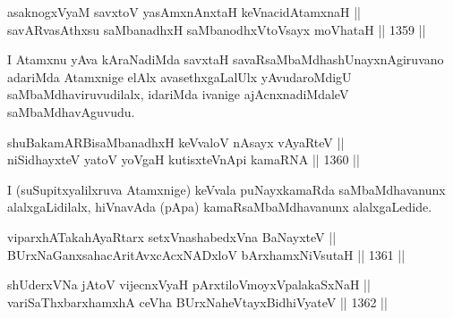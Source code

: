 
\begin{shl}
asaknogxV\s yaM savxtoV yasAmxnAnxtaH keVnacidAtamxnaH || \\
savARvasAthxsu saMbanadhxH saMbanodhxV\s toV\s sayx moVhataH \hfill || 1359 ||  
\end{shl}

\begin{artha}
I Atamxnu yAva kAraNadiMda savxtaH savaRsaMbaMdhashUnayxnAgiruvano adariMda Atamxnige elAlx avasethxgaLalUlx yAvudaroMdigU saMbaMdhaviruvudilalx, idariMda ivanige ajAcnxnadiMdaleV saMbaMdhavAguvudu.
\end{artha}


\begin{shl}
shuBakamARBisaMbanadhxH keVvaloV nAsayx vAyaRteV || \\
niSidhayxteV yatoV yoVgaH kutisxteVnApi kamaRNA \hfill || 1360 ||  
\end{shl}

\begin{artha}
I (suSupitxyalilxruva Atamxnige) keVvala puNayxkamaRda saMbaMdhavanunx alalxgaLidilalx, hiVnavAda (pApa) kamaRsaMbaMdhavanunx alalxgaLedide.
\end{artha}


\begin{shl}
viparxhATakahAyaRtarx setxVnashabedxVna BaNayxteV ||  \\
BUrxNaGanxsahacAritAvxcAcxNADxloV bArxhamxNiVsutaH \hfill || 1361 ||  
\end{shl}

\begin{shl}
shUderxVNa jAtoV vijecnxVyaH \footnotemark[2]pArxtiloVmoyxVpalakaSxNaH ||  \\
variSaThxbarxhamxhA ceVha BUrxNaheVtayxBidhiVyateV \hfill || 1362 ||  
\end{shl}

